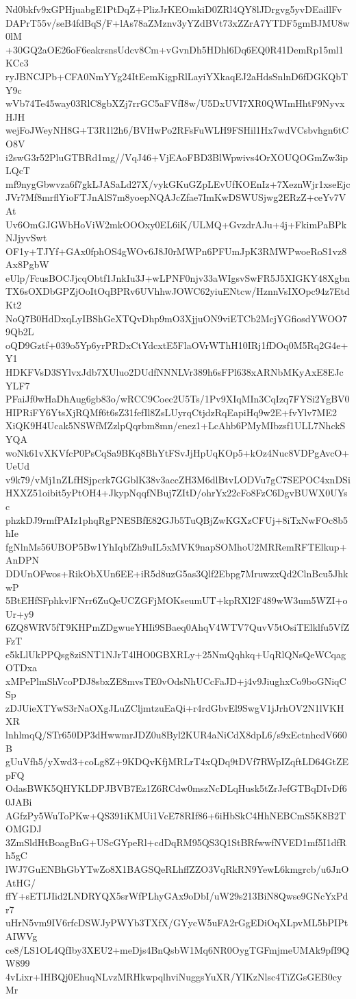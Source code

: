 Nd0bkfv9xGPHjuabgE1PtDqZ+PlizJrKEOmkiD0ZRl4QY8lJDrgvg5yvDEaillFv
DAPrT55v/seB4fdBqS/F+lAs78aZMznv3yYZdBVt73xZZrA7YTDF5gmBJMU8w0lM
+30GQ2aOE26oF6eakrsnsUdcv8Cm+vGvnDh5HDhl6Dq6EQ0R41DemRp15ml1KCc3
ryJBNCJPb+CFA0NmYYg24ItEemKigpRlLayiYXkaqEJ2aHdsSnlnD6fDGKQbTY9c
wVb74Te45way03RlC8gbXZj7rrGC5aFVfI8w/U5DxUVI7XR0QWImHhtF9NyvxHJH
wejFoJWeyNH8G+T3R1l2h6/BVHwPo2RFsFuWLH9FSHil1Hx7wdVCsbvhgn6tCO8V
i2swG3r52PluGTBRd1mg//VqJ46+VjEAoFBD3BlWpwivs4OrXOUQOGmZw3ipLQcT
mf9nygGbwvza6f7gkLJASaLd27X/vykGKuGZpLEvUfKOEnIz+7XeznWjr1xseEjc
JVr7Mf8mrflYioFTJnAlS7m8yoepNQAJcZfae7ImKwDSWUSjwg2ERzZ+ceYv7VAt
Uv6OmGJGWbHoViW2mkOOOxy0EL6iK/ULMQ+GvzdrAJu+4j+FkimPaBPkNJjyvSwt
OF1y+TJYf+GAx0fphOS4gWOv6J8J0rMWPn6PFUmJpK3RMWPwoeRoS1vz8Ax8PgbW
eUlp/FcusBOCJjcqObtf1JnkIu3J+wLPNF0njv33aWIgsvSwFR5J5XIGKY48Xgbn
TX6sOXDbGPZjOoItOqBPRv6UVhhwJOWC62yiuENtcw/HznnVsIXOpc94z7EtdKt2
NoQ7B0HdDxqLyIBShGeXTQvDhp9mO3XjjuON9viETCb2McjYGfiosdYWOO79Qb2L
oQD9Gztf+039o5Yp6yrPRDxCtYdcxtE5FlaOVrWThH10IRj1fDOq0M5Rq2G4e+Y1
HDKFVsD3SYlvxJdb7XUluo2DUdfNNNLVr389h6sFPl638xARNbMKyAxE8EJcYLF7
PFaiJf0wHaDhAug6gb83o/wRCC9Coec2U5Ts/1Pv9XIqMIn3CqIzq7FYSi2YgBV0
HIPRiFY6YtsXjRQMf6t6sZ31fefIl8ZsLUyrqCtjdzRqEapiHq9w2E+fvYlv7ME2
XiQK9H4Ucak5NSWfMZzlpQqrbm8mn/enez1+LcAhb6PMyMIbzsf1ULL7NhckSYQA
woNk61vXKVfcP0PsCqSa9BKq8BhYtFSvJjHpUqKOp5+kOz4Nuc8VDPgAvcO+UeUd
v9k79/vMj1nZLfHSjpcrk7GGblK38v3accZH3M6dlBtvLODVu7gC7SEPOC4xnDSi
HXXZ51oibit5yPtOH4+JkypNqqfNBuj7ZItD/ohrYx22cFo8FzC6DgvBUWX0UYsc
phzkDJ9rmfPAIz1phqRgPNESBfE82GJb5TuQBjZwKGXzCFUj+8iTxNwFOc8b5hIe
fgNlnMs56UBOP5Bw1YhIqbfZh9uIL5xMVK9napSOMhoU2MRRemRFTElkup+AnDPN
DDUnOFwos+RikObXUn6EE+iR5d8uzG5as3Qlf2Ebpg7MruwzxQd2ClnBcu5JhkwP
5BtEHfSFphkvlFNrr6ZuQeUCZGFjMOKseumUT+kpRXl2F489wW3um5WZI+oUr+y9
6ZQ8WRV5fT9KHPmZDgwueYHIi9SBaeq0AhqV4WTV7QuvV5tOsiTElklfu5VfZFzT
e5kLlUkPPQsg8ziSNT1NJrT4lHO0GBXRLy+25NmQqhkq+UqRlQNsQeWCqagOTDxa
xMPePlmShVcoPDJ8sbxZE8mvsTE0vOdsNhUCcFaJD+j4v9JiughxCo9boGNiqCSp
zDJUieXTYwS3rNaOXgJLuZCljmtzuEaQi+r4rdGbvEl9SwgV1jJrhOV2N1lVKHXR
lnhlmqQ/STr650DP3dHwwmrJDZ0u8Byl2KUR4aNiCdX8dpL6/s9xEctnhcdV660B
gUuVfh5/yXwd3+coLg8Z+9KDQvKfjMRLrT4xQDq9tDVf7RWpIZqftLD64GtZEpFQ
OdasBWK5QHYKLDPJBVB7Ez1Z6RCdw0mszNcDLqHusk5tZrJefGTBqDIvDf60JABi
AGfzPy5WuToPKw+QS391iKMUi1VcE78RIf86+6iHbSkC4HhNEBCmS5K8B2TOMGDJ
3ZmSldHtBoagBnG+UScGYpeRl+cdDqRM95QS3Q1StBRfwwfNVED1mf5I1dfRh5gC
lWJ7GuENBhGbYTwZo8X1BAGSQeRLhffZZO3VqRkRN9YewL6kmgrcb/u6JnOAtHG/
ffY+sETIJIid2LNDRYQX5srWfPLhyGAx9oDbI/uW29s213BiN8Qwse9GNcYxPdr7
uHrN5vm9IV6rfcDSWJyPWYb3TXfX/GYycW5uFA2rGgEDiOqXLpvML5bPIPtAIWVg
ce8/LS1OL4QfIby3XEU2+meDjs4BnQsbW1Mq6NR0OygTGFmjmeUMAk9pfI9QW899
4vLixr+IHBQj0EhuqNLvzMRHkwpqlhviNuggsYuXR/YIKzNlsc4TiZGsGEB0cyMr
